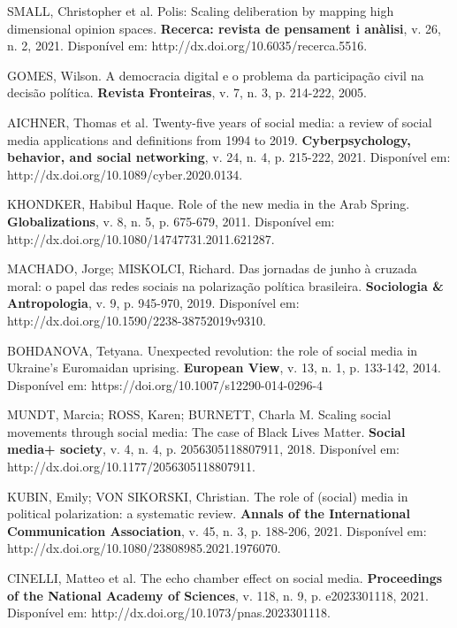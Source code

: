 

SMALL, Christopher et al. Polis: Scaling deliberation by mapping high dimensional opinion spaces. \textbf{Recerca: revista de pensament i anàlisi}, v. 26, n. 2, 2021. Disponível em: http://dx.doi.org/10.6035/recerca.5516.

GOMES, Wilson. A democracia digital e o problema da participação civil na decisão política. \textbf{Revista Fronteiras}, v. 7, n. 3, p. 214-222, 2005.

AICHNER, Thomas et al. Twenty-five years of social media: a review of social media applications and definitions from 1994 to 2019. \textbf{Cyberpsychology, behavior, and social networking}, v. 24, n. 4, p. 215-222, 2021. Disponível em: http://dx.doi.org/10.1089/cyber.2020.0134. 

KHONDKER, Habibul Haque. Role of the new media in the Arab Spring. \textbf{Globalizations}, v. 8, n. 5, p. 675-679, 2011. Disponível em: http://dx.doi.org/10.1080/14747731.2011.621287. 

MACHADO, Jorge; MISKOLCI, Richard. Das jornadas de junho à cruzada moral: o papel das redes sociais na polarização política brasileira. \textbf{Sociologia \& Antropologia}, v. 9, p. 945-970, 2019. Disponível em: http://dx.doi.org/10.1590/2238-38752019v9310. 

BOHDANOVA, Tetyana. Unexpected revolution: the role of social media in Ukraine's Euromaidan uprising. \textbf{European View}, v. 13, n. 1, p. 133-142, 2014. Disponível em: https://doi.org/10.1007/s12290-014-0296-4

MUNDT, Marcia; ROSS, Karen; BURNETT, Charla M. Scaling social movements through social media: The case of Black Lives Matter. \textbf{Social media+ society}, v. 4, n. 4, p. 2056305118807911, 2018. Disponível em: http://dx.doi.org/10.1177/2056305118807911. 

KUBIN, Emily; VON SIKORSKI, Christian. The role of (social) media in political polarization: a systematic review. \textbf{Annals of the International Communication Association}, v. 45, n. 3, p. 188-206, 2021. Disponível em: http://dx.doi.org/10.1080/23808985.2021.1976070. 

CINELLI, Matteo et al. The echo chamber effect on social media. \textbf{Proceedings of the National Academy of Sciences}, v. 118, n. 9, p. e2023301118, 2021. Disponível em: http://dx.doi.org/10.1073/pnas.2023301118. 

